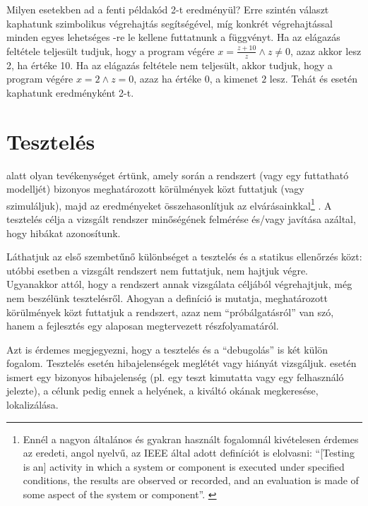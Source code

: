 \begin{megjegyzes}
Milyen esetekben ad a fenti példakód 2-t eredményül? Erre szintén választ kaphatunk szimbolikus végrehajtás segítségével, míg konkrét végrehajtással minden egyes lehetséges -re le kellene futtatnunk a függvényt. Ha az elágazás feltétele teljesült tudjuk, hogy a program végére $x = \frac{z+10}{z} \wedge z \neq 0$, azaz  akkor lesz 2, ha  értéke 10. Ha az elágazás feltétele nem teljesült, akkor tudjuk, hogy a program végére $x = 2 \wedge z = 0$, azaz ha  értéke 0, a kimenet $2$ lesz. Tehát  és  esetén kaphatunk eredményként 2-t.
\end{megjegyzes}




\section{Tesztelés}\label{sec:teszteles}

 alatt olyan tevékenységet értünk, amely során a rendszert (vagy egy futtatható modelljét) bizonyos meghatározott körülmények közt futtatjuk (vagy szimuláljuk), majd az eredményeket összehasonlítjuk az elvárásainkkal\footnote{Ennél a nagyon általános és gyakran használt fogalomnál kivételesen érdemes az eredeti, angol nyelvű, az IEEE által adott definíciót is elolvasni: ``[Testing is an] activity in which a system or component is executed under specified conditions, the results are observed or recorded, and an evaluation is made of some aspect of the system or component''. \cite{IEEE-24765}} \cite{IEEE-24765}. A tesztelés célja a vizsgált rendszer minőségének felmérése és/vagy javítása azáltal, hogy hibákat azonosítunk. 

Láthatjuk az első szembetűnő különbséget a tesztelés és a statikus ellenőrzés közt: utóbbi esetben a vizsgált rendszert nem futtatjuk, nem hajtjuk végre. Ugyanakkor attól, hogy a rendszert annak vizsgálata céljából végrehajtjuk, még nem beszélünk tesztelésről. Ahogyan a definíció is mutatja, meghatározott körülmények közt futtatjuk a rendszert, azaz nem ``próbálgatásról'' van szó, hanem a fejlesztés egy alaposan megtervezett részfolyamatáról.

Azt is érdemes megjegyezni, hogy a tesztelés és a ``debugolás'' is két külön fogalom. Tesztelés esetén hibajelenségek meglétét vagy hiányát vizsgáljuk.  esetén ismert egy bizonyos hibajelenség (pl. egy teszt kimutatta vagy egy felhasználó jelezte), a célunk pedig ennek a helyének, a kiváltó okának megkeresése, lokalizálása.

